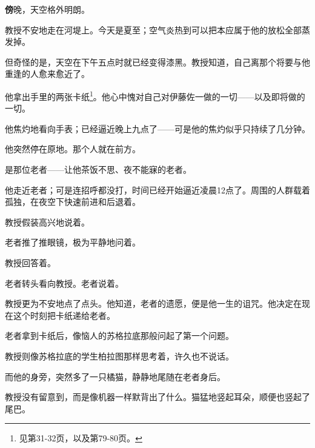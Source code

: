
\AddSymbolsH
\pagecolor{MidnightBlue!20!Gray}
\color{white}
\quad\quad \lettrine[,lraise=0.2,lhang=0.5]{\textbf{傍}}{晚}，天空格外明朗。

教授不安地走在河堤上。今天是夏至；空气炎热到可以把本应属于他的放松全部蒸发掉。

但奇怪的是，天空在下午五点时就已经变得漆黑。教授知道，自己离那个将要与他重逢的人愈来愈近了。

他拿出手里的两张卡纸\footnote{见第31-32页，以及第79-80页。}。他心中愧对自己对伊藤佐一做的一切——以及即将做的一切。

他焦灼地看向手表；已经逼近晚上九点了——可是他的焦灼似乎只持续了几分钟。

他突然停在原地。那个人就在前方。

是那位老者——让他茶饭不思、夜不能寐的老者。

他走近老者；可是连招呼都没打，时间已经开始逼近凌晨12点了。周围的人群载着孤独，在夜空下快速前进和后退着。

教授假装高兴地说着。


老者推了推眼镜，极为平静地问着。

教授回答着。

老者转头看向教授。老者说着。

教授更为不安地点了点头。他知道，老者的遗愿，便是他一生的诅咒。他决定在现在这个时刻把卡纸递给老者。

老者拿到卡纸后，像恼人的苏格拉底那般问起了第一个问题。


教授则像苏格拉底的学生柏拉图那样思考着，许久也不说话。

而他的身旁，突然多了一只橘猫，静静地尾随在老者身后。

教授没有留意到，而是像机器一样默背出了什么。猫猛地竖起耳朵，顺便也竖起了尾巴。


